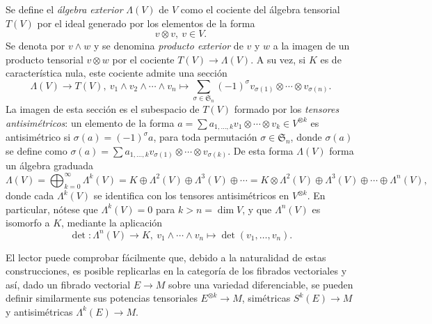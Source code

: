 \documentclass[11pt,a4paper]{amsbook}
\theoremstyle{remark} \newtheorem{rmk}[subsection]{Observación}
\theoremstyle{definition} \newtheorem{defn}[subsection]{Definición}
\theoremstyle{definition} \newtheorem{ex}[subsection]{Ejemplo}
\theoremstyle{definition} \newtheorem{ej}[subsection]{Ejercicio}
\begin{document}
Se define el \emph{álgebra exterior} $\Lambda(V)$ de $V$ como el cociente del álgebra tensorial $T(V)$ por el ideal generado por los elementos de la forma
\begin{equation*}
v\otimes v, \ v\in V.
\end{equation*}
Se denota por $v\wedge w$ y se denomina \emph{producto exterior} de $v$ y $w$ a la imagen de un producto tensorial $v\otimes w$ por el cociente $T(V)\rightarrow \Lambda(V)$. A su vez, si $K$ es de característica nula, este cociente admite una sección
\begin{equation*}
\Lambda(V) \rightarrow T(V), \  v_1\wedge v_2\wedge \cdots \wedge v_n \mapsto \sum_{\sigma \in \mathfrak{S}_n} (-1)^\sigma v_{\sigma(1)} \otimes \cdots \otimes v_{\sigma(n)}.
\end{equation*}
La imagen de esta sección es el subespacio de $T(V)$ formado por los \emph{tensores antisimétricos}: un elemento de la forma $a=\sum a_{1,\dots,k} v_{1} \otimes \cdots \otimes v_k \in V^{\otimes k}$ es antisimétrico si $\sigma(a)=(-1)^\sigma a$, para toda permutación $\sigma \in \mathfrak{S}_n$, donde $\sigma(a)$ se define como $\sigma(a)=\sum a_{1,\dots,k} v_{\sigma(1)}\otimes \cdots \otimes v_{\sigma(k)}$. De esta forma $\Lambda(V)$ forma un álgebra graduada
\begin{equation*}
\Lambda(V) = \bigoplus_{k=0}^\infty \Lambda^k(V) = K \oplus \Lambda^2(V) \oplus \Lambda^3(V) \oplus \cdots = K\otimes \Lambda^2(V) \oplus \Lambda^3(V) \oplus \cdots \oplus \Lambda^n(V),
\end{equation*}
donde cada $\Lambda^k(V)$ se identifica con los tensores antisimétricos en $V^{\otimes k}$. En particular, nótese que $\Lambda^k(V)=0$ para $k>n=\dim V$, y que $\Lambda^n(V)$ es isomorfo a $K$, mediante la aplicación
\begin{equation*}
\det: \Lambda^n(V) \rightarrow K,\ v_1\wedge \cdots \wedge v_n \mapsto \det(v_1, \dots, v_n).
\end{equation*}

El lector puede comprobar fácilmente que, debido a la naturalidad de estas construcciones, es posible replicarlas en la categoría de los fibrados vectoriales y así, dado un fibrado vectorial $E\rightarrow M$ sobre una variedad diferenciable, se pueden definir similarmente sus potencias tensoriales $E^{\otimes k}\rightarrow M$, simétricas $S^k(E)\rightarrow M$ y antisimétricas $\Lambda^k(E)\rightarrow M$.
\end{document}
